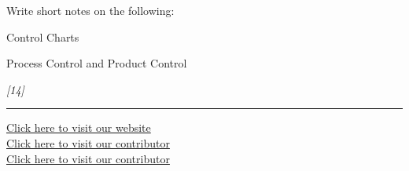 \documentclass[11pt,a4paper]{article}
\newcommand{\pts}[1]{\hfill   \textit{[#1]}}
\begin{document}
Write short notes on the following:

\begin{parts}
  \item Control Charts
  \item Process Control and Product Control
\end{parts}\pts{14}

\vfill
\rule{\linewidth}{0.4pt}

\begin{center}\small
\href{https://bhu-exam.vercel.app/}{Click here to visit our website}\\[4pt]
\href{https://me-aryan.vercel.app/}{Click here to visit our contributor}\\[4pt]
\href{https://quashan-me.vercel.app/}{Click here to visit our contributor}
\end{center}
\end{document}
